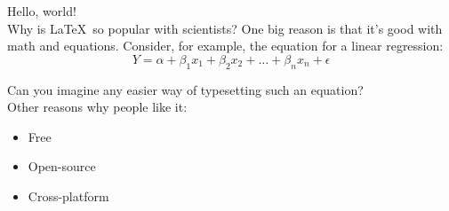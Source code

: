 \documentclass{article}
\begin{document}
Hello, world! \\

Why is \LaTeX\ so popular with scientists? One big reason is that it's good with math and equations. Consider, for example, the equation for a linear regression: $$Y = \alpha + \beta_1x_1 + \beta_2x_2 + \ldots + \beta_nx_n + \epsilon$$

Can you imagine any easier way of typesetting such an equation? \\

\noindent
Other reasons why people like it:
\begin{itemize}
	\item{Free}
	\item{Open-source}
	\item{Cross-platform}
\end{itemize}
	
\end{document}
